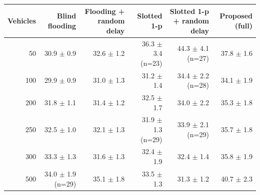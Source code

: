 \scriptsize
\renewcommand{\arraystretch}{1.2}
\begin{tabular}{rrrrrr}
\toprule
Vehicles & Blind flooding & Flooding + random delay & Slotted 1-p & Slotted 1-p + random delay & Proposed (full) \\
\midrule
50 & 30.9 $\pm$ 0.9 & 32.6 $\pm$ 1.2 & 36.3 $\pm$ 3.4 (n=23) & 44.3 $\pm$ 4.1 (n=27) & 37.8 $\pm$ 1.6 \\
100 & 29.9 $\pm$ 0.9 & 31.0 $\pm$ 1.3 & 31.2 $\pm$ 1.4 & 34.4 $\pm$ 2.2 (n=28) & 34.1 $\pm$ 1.9 \\
200 & 31.8 $\pm$ 1.1 & 31.4 $\pm$ 1.2 & 32.5 $\pm$ 1.7 & 34.0 $\pm$ 2.2 & 35.3 $\pm$ 1.8 \\
250 & 32.5 $\pm$ 1.0 & 32.1 $\pm$ 1.3 & 31.9 $\pm$ 1.3 (n=29) & 33.9 $\pm$ 2.1 (n=29) & 35.7 $\pm$ 1.8 \\
300 & 33.3 $\pm$ 1.3 & 31.6 $\pm$ 1.3 & 32.4 $\pm$ 1.9 & 32.4 $\pm$ 1.4 & 35.8 $\pm$ 1.9 \\
500 & 34.0 $\pm$ 1.9 (n=29) & 35.1 $\pm$ 1.8 & 33.5 $\pm$ 1.3 & 31.3 $\pm$ 1.2 & 40.7 $\pm$ 2.3 \\
\bottomrule
\end{tabular}
